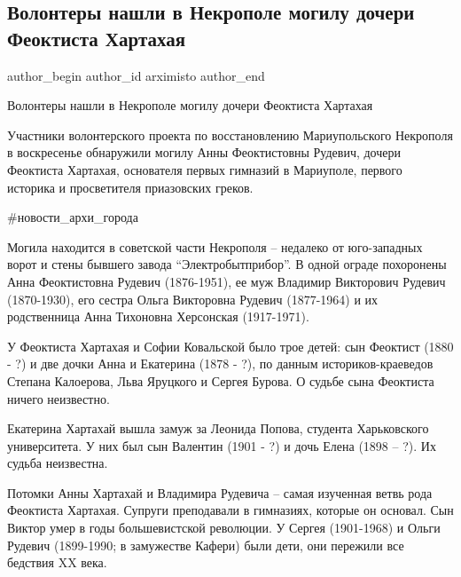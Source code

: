  
 
 
 
 

\subsection{Волонтеры нашли в Некрополе могилу дочери Феоктиста Хартахая}
\label{sec:13_10_2020.fb.arximisto.1.volontery_nashli_mogilu_docheri_feoktista_hartahaja}

\ifcmt
 author_begin
   author_id arximisto
 author_end
\fi

Волонтеры нашли в Некрополе могилу дочери Феоктиста Хартахая

Участники волонтерского проекта по восстановлению Мариупольского Некрополя в
воскресенье обнаружили могилу Анны Феоктистовны Рудевич, дочери Феоктиста
Хартахая, основателя первых гимназий в Мариуполе, первого историка и
просветителя приазовских греков.

\#новости\_архи\_города

Могила находится в советской части Некрополя – недалеко от юго-западных ворот и
стены бывшего завода \enquote{Электробытприбор}. В одной ограде похоронены Анна
Феоктистовна Рудевич (1876-1951), ее муж Владимир Викторович Рудевич
(1870-1930), его сестра Ольга Викторовна Рудевич (1877-1964) и их родственница
Анна Тихоновна Херсонская (1917-1971).

У Феоктиста Хартахая и Софии Ковальской было трое детей: сын Феоктист (1880 -
?) и две дочки Анна и Екатерина (1878 - ?), по данным историков-краеведов
Степана Калоерова, Льва Яруцкого и Сергея Бурова. О судьбе сына Феоктиста
ничего неизвестно.

Екатерина Хартахай вышла замуж за Леонида Попова, студента Харьковского
университета. У них был сын Валентин (1901 - ?) и дочь Елена (1898 – ?). Их
судьба неизвестна.

Потомки Анны Хартахай и Владимира Рудевича – самая изученная ветвь рода
Феоктиста Хартахая. Супруги преподавали в гимназиях, которые он основал. Сын
Виктор умер в годы большевистской революции. У Сергея (1901-1968) и Ольги
Рудевич (1899-1990; в замужестве Кафери) были дети, они пережили все бедствия
XX века.

